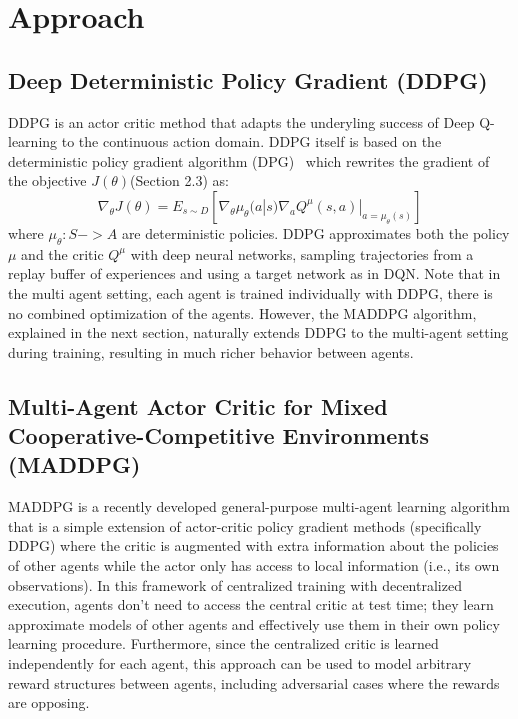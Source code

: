 
\section{Approach}
\label{sec:approach}

\subsection{Deep Deterministic Policy Gradient (DDPG)}
DDPG is an actor critic method that adapts the underyling success of Deep Q-learning 
to the continuous action domain. DDPG itself is based on the deterministic
policy gradient algorithm (DPG)~\cite{silver2014deterministic} which rewrites the gradient
of the objective $J(\theta)$(Section 2.3) as:
\begin{equation}
\nabla_{\theta}J(\theta) = E_{s \sim D} [\nabla_{\theta}\mu_{\theta}(a|s)\nabla_{a} Q^{\mu}(s,a)|_{a = \mu_{\theta}(s)}]
\end{equation}
where $\mu_{\theta}: S -> A$ are deterministic policies. DDPG approximates
both the policy $\mu$ and the critic $Q^{\mu}$ with deep neural networks, sampling
trajectories from a replay buffer of experiences and using a target network as 
in DQN. Note that in the multi agent setting, each agent is trained individually
with DDPG, there is no combined optimization of the agents. However, the MADDPG 
algorithm, explained in the next section, naturally extends DDPG to the multi-agent
setting during training, resulting in much richer behavior between agents. 

\subsection{Multi-Agent Actor Critic for Mixed Cooperative-Competitive Environments (MADDPG)}
MADDPG is a recently developed general-purpose multi-agent learning algorithm
that is a simple extension of actor-critic policy gradient methods (specifically DDPG) 
where the critic is augmented with extra information about the policies of other 
agents while the actor only has access to local information (i.e., its own
observations). In this framework of centralized training with decentralized
execution, agents don’t need to access the central critic at test time; they
learn approximate models of other agents and effectively use them in their own
policy learning procedure. Furthermore, since the centralized critic is
learned independently for each agent, this approach can be used to model arbitrary 
reward structures between agents, including adversarial cases where the rewards are opposing.

